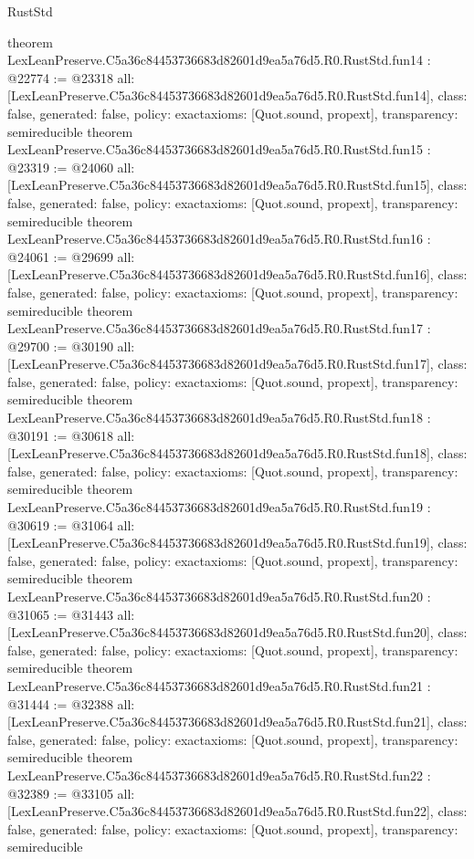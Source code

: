 \begin{lexlean}{RustStd}
\begin{coremodule}
{}
theorem LexLeanPreserve.C5a36c84453736683d82601d9ea5a76d5.R0.RustStd.fun14 : @22774 := @23318 {
  all: [LexLeanPreserve.C5a36c84453736683d82601d9ea5a76d5.R0.RustStd.fun14],
  class: false,
  generated: false,
  policy: exact{axioms: [Quot.sound, propext]},
  transparency: semireducible
}
theorem LexLeanPreserve.C5a36c84453736683d82601d9ea5a76d5.R0.RustStd.fun15 : @23319 := @24060 {
  all: [LexLeanPreserve.C5a36c84453736683d82601d9ea5a76d5.R0.RustStd.fun15],
  class: false,
  generated: false,
  policy: exact{axioms: [Quot.sound, propext]},
  transparency: semireducible
}
theorem LexLeanPreserve.C5a36c84453736683d82601d9ea5a76d5.R0.RustStd.fun16 : @24061 := @29699 {
  all: [LexLeanPreserve.C5a36c84453736683d82601d9ea5a76d5.R0.RustStd.fun16],
  class: false,
  generated: false,
  policy: exact{axioms: [Quot.sound, propext]},
  transparency: semireducible
}
theorem LexLeanPreserve.C5a36c84453736683d82601d9ea5a76d5.R0.RustStd.fun17 : @29700 := @30190 {
  all: [LexLeanPreserve.C5a36c84453736683d82601d9ea5a76d5.R0.RustStd.fun17],
  class: false,
  generated: false,
  policy: exact{axioms: [Quot.sound, propext]},
  transparency: semireducible
}
theorem LexLeanPreserve.C5a36c84453736683d82601d9ea5a76d5.R0.RustStd.fun18 : @30191 := @30618 {
  all: [LexLeanPreserve.C5a36c84453736683d82601d9ea5a76d5.R0.RustStd.fun18],
  class: false,
  generated: false,
  policy: exact{axioms: [Quot.sound, propext]},
  transparency: semireducible
}
theorem LexLeanPreserve.C5a36c84453736683d82601d9ea5a76d5.R0.RustStd.fun19 : @30619 := @31064 {
  all: [LexLeanPreserve.C5a36c84453736683d82601d9ea5a76d5.R0.RustStd.fun19],
  class: false,
  generated: false,
  policy: exact{axioms: [Quot.sound, propext]},
  transparency: semireducible
}
theorem LexLeanPreserve.C5a36c84453736683d82601d9ea5a76d5.R0.RustStd.fun20 : @31065 := @31443 {
  all: [LexLeanPreserve.C5a36c84453736683d82601d9ea5a76d5.R0.RustStd.fun20],
  class: false,
  generated: false,
  policy: exact{axioms: [Quot.sound, propext]},
  transparency: semireducible
}
theorem LexLeanPreserve.C5a36c84453736683d82601d9ea5a76d5.R0.RustStd.fun21 : @31444 := @32388 {
  all: [LexLeanPreserve.C5a36c84453736683d82601d9ea5a76d5.R0.RustStd.fun21],
  class: false,
  generated: false,
  policy: exact{axioms: [Quot.sound, propext]},
  transparency: semireducible
}
theorem LexLeanPreserve.C5a36c84453736683d82601d9ea5a76d5.R0.RustStd.fun22 : @32389 := @33105 {
  all: [LexLeanPreserve.C5a36c84453736683d82601d9ea5a76d5.R0.RustStd.fun22],
  class: false,
  generated: false,
  policy: exact{axioms: [Quot.sound, propext]},
  transparency: semireducible
}
\end{coremodule}
\end{lexlean}
